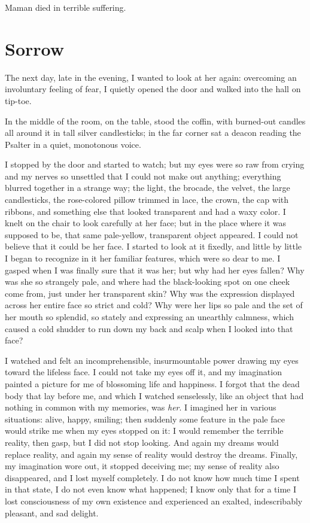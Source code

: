 Maman died in terrible suffering.

\chapter{Sorrow} %

The next day, late in the evening, I wanted to look at her again: overcoming an involuntary feeling of fear, I quietly opened the door and walked into the hall on tip-toe.

In the middle of the room, on the table, stood the coffin, with burned-out candles all around it in tall silver candlesticks; in the far corner sat a deacon reading the Psalter in a quiet, monotonous voice.

I stopped by the door and started to watch; but my eyes were so raw from crying and my nerves so unsettled that I could not make out anything; everything blurred together in a strange way; the light, the brocade, the velvet, the large candlesticks, the rose-colored pillow trimmed in lace, the crown, the cap with ribbons, and something else that looked transparent and had a waxy color. I knelt on the chair to look carefully at her face; but in the place where it was supposed to be, that same pale-yellow, transparent object appeared. I could not believe that it could be her face. I started to look at it fixedly, and little by little I began to recognize in it her familiar features, which were so dear to me. I gasped when I was finally sure that it was her; but why had her eyes fallen? Why was she so strangely pale, and where had the black-looking spot on one cheek come from, just under her transparent skin? Why was the expression displayed across her entire face so strict and cold? Why were her lips so pale and the set of her mouth so splendid, so stately and expressing an unearthly calmness, which caused a cold shudder to run down my back and scalp when I looked into that face?

I watched and felt an incomprehensible, insurmountable power drawing my eyes toward the lifeless face. I could not take my eyes off it, and my imagination painted a picture for me of blossoming life and happiness. I forgot that the dead body that lay before me, and which I watched senselessly, like an object that had nothing in common with my memories, was \emph{her}. I imagined her in various situations: alive, happy, smiling; then suddenly some feature in the pale face would strike me when my eyes stopped on it: I would remember the terrible reality, then gasp, but I did not stop looking. And again my dreams would replace reality, and again my sense of reality would destroy the dreams. Finally, my imagination wore out, it stopped deceiving me; my sense of reality also disappeared, and I lost myself completely. I do not know how much time I spent in that state, I do not even know what happened; I know only that for a time I lost consciousness of my own existence and experienced an exalted, indescribably pleasant, and sad delight.

